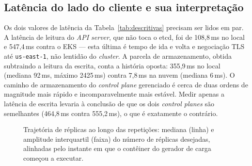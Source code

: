 \documentclass[conference]{IEEEtran}
\begin{document}
\subsection{Latência do lado do cliente e sua interpretação}

Os dois valores de latência da Tabela~\ref{tab:descritivas} precisam ser lidos em
par. A latência de leitura do \emph{API server}, que não toca o etcd, foi de
108,8\,ms no local e 547,4\,ms contra o EKS --- esta última é tempo de ida e
volta e negociação TLS até \texttt{us-east-1}, não lentidão do \emph{cluster}. A
parcela de armazenamento, obtida subtraindo a leitura da escrita, conta a
história oposta: 355,9\,ms no local (mediana 92\,ms, máximo 2425\,ms) contra
7,8\,ms na nuvem (mediana 6\,ms). O caminho de armazenamento do \emph{control
plane} gerenciado é cerca de duas ordens de magnitude mais rápido e
incomparavelmente mais estável. Medir apenas a latência de escrita levaria à
conclusão de que os dois \emph{control planes} são semelhantes (464,8\,ms contra
555,2\,ms), o que é exatamente o contrário.

\begin{figure}[!t]
\centering
{}
\caption{Trajetória de réplicas ao longo das repetições: mediana (linha) e
amplitude interquartil (faixa) do número de réplicas desejadas, alinhadas pelo
instante em que o contêiner do gerador de carga começou a executar.}
\label{fig:trajetoria}
\end{figure}
\end{document}
